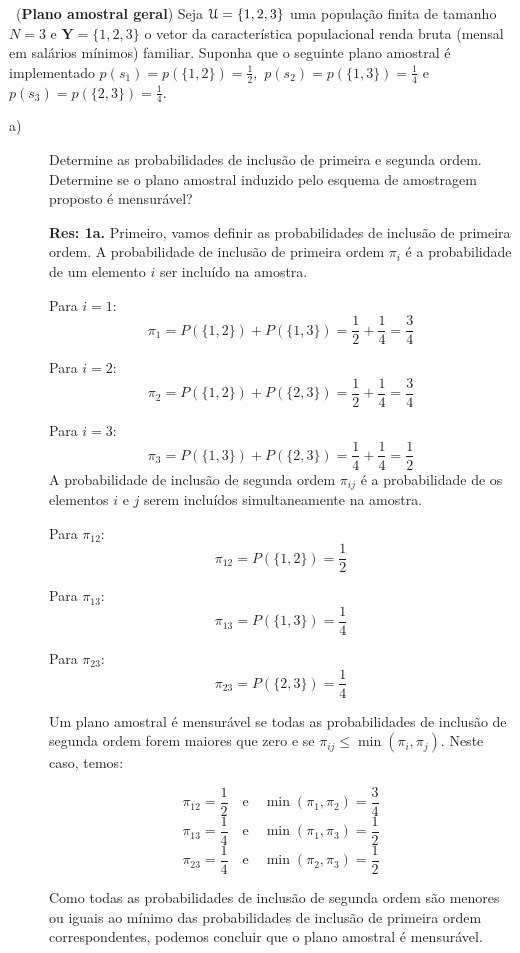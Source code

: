 \documentclass[a4paper,11pt,oneside,twocolumn]{Config/milktest}
\begin{document}
\medskip 
\question~({\bf Plano amostral geral})    Seja 
${\cal U}=\{1,2,3\}$ uma população finita de tamanho $N=3$ e $\mathbf{Y} =\{1,2,3\}$  o vetor da característica populacional renda bruta (mensal em salários mínimos) familiar.  Suponha que o seguinte plano amostral é implementado 
$p(s_1)=p(\{1,2\})=\frac{1}{2},$ $p(s_2)=p(\{1,3\})=\frac{1}{4}$ e
$p(s_3)=p(\{2,3\})=\frac{1}{4}.$
\begin{description}
\item[a)] Determine as probabilidades de inclusão de primeira e  segunda ordem. Determine se o plano amostral induzido pelo esquema de amostragem proposto é mensurável?


{\scriptsize
\noindent \textbf{Res: 1a.} Primeiro, vamos definir as probabilidades de inclusão de primeira ordem. A probabilidade de inclusão de primeira ordem \(\pi_i\) é a probabilidade de um elemento \(i\) ser incluído na amostra. 

Para \(i = 1\):
\[
\pi_1 = P(\{1, 2\}) + P(\{1, 3\}) = \frac{1}{2} + \frac{1}{4} = \frac{3}{4}
\]

Para \(i = 2\):
\[
\pi_2 = P(\{1, 2\}) + P(\{2, 3\}) = \frac{1}{2} + \frac{1}{4} = \frac{3}{4}
\]

Para \(i = 3\):
\[
\pi_3 = P(\{1, 3\}) + P(\{2, 3\}) = \frac{1}{4} + \frac{1}{4} = \frac{1}{2}
\] 
A probabilidade de inclusão de segunda ordem \(\pi_{ij}\) é a probabilidade de os elementos \(i\) e \(j\) serem incluídos simultaneamente na amostra.

Para \(\pi_{12}\):
\[
\pi_{12} = P(\{1, 2\}) = \frac{1}{2}
\]

Para \(\pi_{13}\):
\[
\pi_{13} = P(\{1, 3\}) = \frac{1}{4}
\]

Para \(\pi_{23}\):
\[
\pi_{23} = P(\{2, 3\}) = \frac{1}{4}
\]

Um plano amostral é mensurável se todas as probabilidades de inclusão de segunda ordem forem maiores que zero e se \(\pi_{ij} \leq \min(\pi_i, \pi_j)\). Neste caso, temos:

\[
\pi_{12} = \frac{1}{2} \quad \text{e} \quad \min(\pi_1, \pi_2) = \frac{3}{4}
\]
\[
\pi_{13} = \frac{1}{4} \quad \text{e} \quad \min(\pi_1, \pi_3) = \frac{1}{2}
\]
\[
\pi_{23} = \frac{1}{4} \quad \text{e} \quad \min(\pi_2, \pi_3) = \frac{1}{2}
\]

Como todas as probabilidades de inclusão de segunda ordem são menores ou iguais ao mínimo das probabilidades de inclusão de primeira ordem correspondentes, podemos concluir que o plano amostral é mensurável.
}



\end{description}
\end{document}
